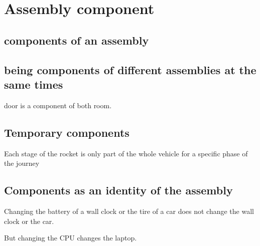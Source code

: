 \chapter{Assembly component}

\section{components of an assembly}





\section{being components of different assemblies at the same times}

door is a component of both room.

\section{Temporary components}

Each stage of the rocket is only part of the whole vehicle for a specific phase of the journey

\section {Components as an identity of the assembly}

Changing the battery of a wall clock or the tire of a car does not change the wall clock or the car.

But changing the CPU changes the laptop. 








